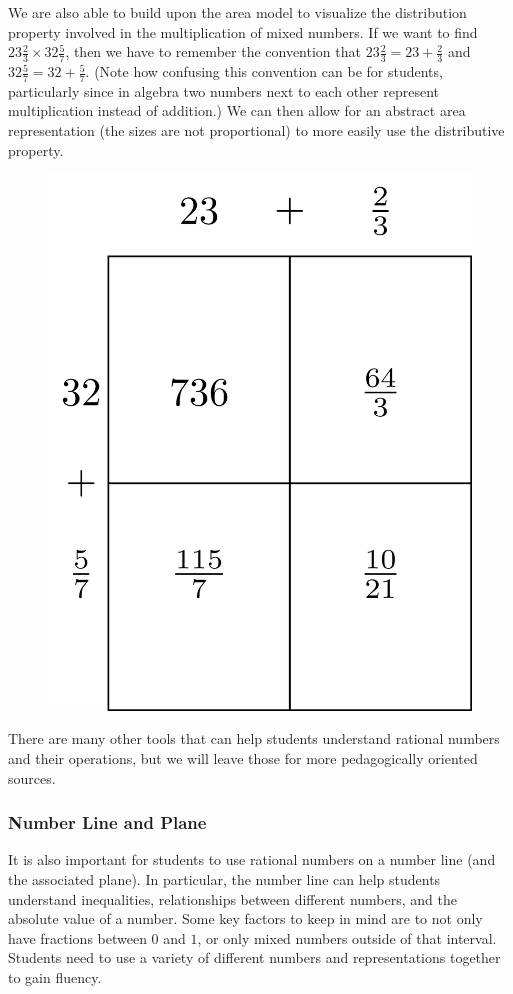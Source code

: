 \documentclass[
]{book}
\theoremstyle{definition}
\theoremstyle{definition}
\theoremstyle{definition}
\theoremstyle{definition}
\theoremstyle{remark}
\begin{document}
We are also able to build upon the area model to visualize the distribution property involved in the multiplication of mixed numbers. If we want to find \(23\frac{2}{3} \times 32 \frac{5}{7}\), then we have to remember the convention that \(23\frac{2}{3} = 23 + \frac{2}{3}\) and \(32\frac{5}{7}= 32 + \frac{5}{7}\). (Note how confusing this convention can be for students, particularly since in algebra two numbers next to each other represent multiplication instead of addition.) We can then allow for an abstract area representation (the sizes are not proportional) to more easily use the distributive property.

\begin{figure}

{\centering \includegraphics[width=0.5\linewidth]{tikz/area-model-Mixednumbers} 

}

\end{figure}

There are many other tools that can help students understand rational numbers and their operations, but we will leave those for more pedagogically oriented sources.

\hypertarget{number-line-and-plane}{%
\subsubsection{Number Line and Plane}\label{number-line-and-plane}}

It is also important for students to use rational numbers on a number line (and the associated plane). In particular, the number line can help students understand inequalities, relationships between different numbers, and the absolute value of a number. Some key factors to keep in mind are to not only have fractions between \(0\) and \(1\), or only mixed numbers outside of that interval. Students need to use a variety of different numbers and representations together to gain fluency.
\end{document}

